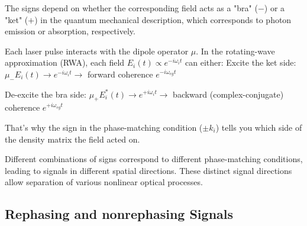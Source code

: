 \noindent 
The signs depend on whether the corresponding field acts as a "bra" ($-$) or a "ket" ($+$) in the quantum mechanical description, which corresponds to photon emission or absorption, respectively.

Each laser pulse interacts with the dipole operator $\mu$.
In the rotating-wave approximation (RWA), each field $E_i(t) \propto e^{-i\omega_i t}$ can either:
Excite the ket side: $\mu_{-} E_i(t) \rightarrow e^{-i\omega_i t} \rightarrow$ forward coherence $e^{-i\omega_{eg} t}$

De-excite the bra side: $\mu_{+} E_i^{*}(t) \rightarrow e^{+i\omega_i t} \rightarrow$ backward (complex-conjugate) coherence $e^{+i\omega_{eg} t}$

That's why the sign in the phase-matching condition ($\pm k_i$) tells you which side of the density matrix the field acted on.

\noindent 
Different combinations of signs correspond to different phase-matching conditions, leading to signals in different spatial directions. These distinct signal directions allow separation of various nonlinear optical processes.


\subsection{Rephasing and nonrephasing Signals}
\label{subsec:rephasing_nonrephasing}

